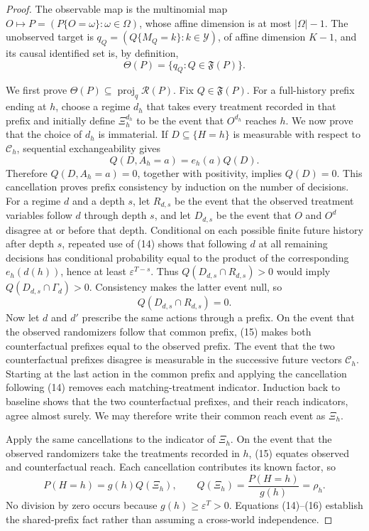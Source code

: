 \documentclass{article}
\begin{document}
\begin{proof}
The observable map is the multinomial map \(O\mapsto P=(P\{O=\omega\}:\omega\in\Omega)\), whose affine dimension is at most \(|\Omega|-1\).  The unobserved target is \(q_Q=(Q\{M_Q=k\}:k\in\mathcal Y)\), of affine dimension \(K-1\), and its causal identified set is, by definition,
\[
 \Theta(P)=\{q_Q:Q\in\mathfrak F(P)\}.                   \tag{13}
\]

We first prove \(\Theta(P)\subseteq\operatorname{proj}_q\mathcal R(P)\).  Fix \(Q\in\mathfrak F(P)\).  For a full-history prefix ending at \(h\), choose a regime \(d_h\) that takes every treatment recorded in that prefix and initially define \(\Xi_h^{d_h}\) to be the event that \(O^{d_h}\) reaches \(h\).  We now prove that the choice of \(d_h\) is immaterial.  If \(D\subseteq\{H=h\}\) is measurable with respect to \(\mathcal C_h\), sequential exchangeability gives
\[
 Q(D,A_h=a)=e_h(a)Q(D).                                   \tag{14}
\]
Therefore \(Q(D,A_h=a)=0\), together with positivity, implies \(Q(D)=0\).  This cancellation proves prefix consistency by induction on the number of decisions.  For a regime \(d\) and a depth \(s\), let \(R_{d,s}\) be the event that the observed treatment variables follow \(d\) through depth \(s\), and let \(D_{d,s}\) be the event that \(O\) and \(O^d\) disagree at or before that depth.  Conditional on each possible finite future history after depth \(s\), repeated use of (14) shows that following \(d\) at all remaining decisions has conditional probability equal to the product of the corresponding \(e_h(d(h))\), hence at least \(\varepsilon^{T-s}\).  Thus \(Q(D_{d,s}\cap R_{d,s})>0\) would imply \(Q(D_{d,s}\cap\Gamma_d)>0\).  Consistency makes the latter event null, so
\[
 Q(D_{d,s}\cap R_{d,s})=0.                                \tag{15}
\]
Now let \(d\) and \(d'\) prescribe the same actions through a prefix.  On the event that the observed randomizers follow that common prefix, (15) makes both counterfactual prefixes equal to the observed prefix.  The event that the two counterfactual prefixes disagree is measurable in the successive future vectors \(\mathcal C_h\).  Starting at the last action in the common prefix and applying the cancellation following (14) removes each matching-treatment indicator.  Induction back to baseline shows that the two counterfactual prefixes, and their reach indicators, agree almost surely.  We may therefore write their common reach event as \(\Xi_h\).

Apply the same cancellations to the indicator of \(\Xi_h\).  On the event that the observed randomizers take the treatments recorded in \(h\), (15) equates observed and counterfactual reach.  Each cancellation contributes its known factor, so
\[
 P(H=h)=g(h)Q(\Xi_h),\qquad
 Q(\Xi_h)=\frac{P(H=h)}{g(h)}=\rho_h.                     \tag{16}
\]
No division by zero occurs because \(g(h)\geq\varepsilon^{T}>0\).  Equations (14)--(16) establish the shared-prefix fact rather than assuming a cross-world independence.


\end{proof}
\end{document}

